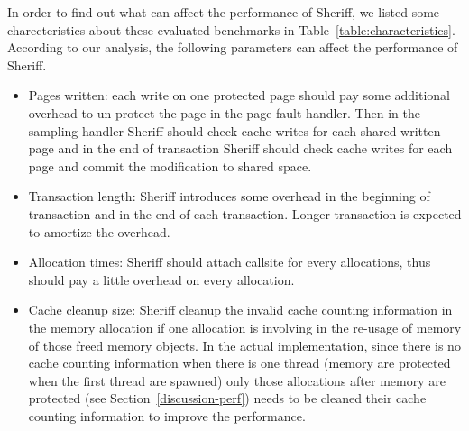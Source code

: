 In order to find out what can affect the performance of Sheriff, we listed some charecteristics about these 
evaluated benchmarks in Table~\ref{table:characteristics}.
According to our analysis, the following parameters can affect the performance of Sheriff. 
\begin{itemize}
\item
Pages written: each write on one protected page should pay some additional overhead 
to un-protect the page in the page fault handler. 
Then in the sampling handler Sheriff should check cache writes for each shared written page and in the 
end of transaction Sheriff should check cache writes for each page and commit the modification to shared space. 

\item
Transaction length: Sheriff introduces some overhead in the beginning of transaction and in the end of each 
transaction. Longer transaction is expected to amortize the overhead. 

\item 
Allocation times: Sheriff should attach callsite for every allocations, thus should pay a little overhead on every allocation.

\item
Cache cleanup size: Sheriff cleanup the invalid cache counting information in the memory allocation 
if one allocation is involving in the re-usage of memory of those freed memory objects. In the actual implementation,
since there is no cache counting information when there is one thread (memory are protected when the first thread are spawned)
only those allocations after memory are protected (see Section~\ref{discussion-perf}) needs to be cleaned their cache counting
information to improve the performance.
\end{itemize}

